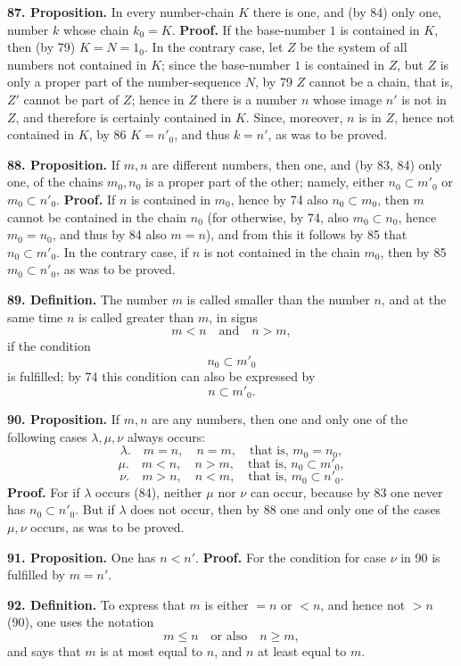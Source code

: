 \documentclass[11pt]{article}
\newcommand{\partof}{\mathrel{\subset}}
\begin{document}
\noindent\textbf{87. Proposition.} In every number-chain $K$ there is one, and (by 84) only one, number $k$ whose chain $k_0=K$. \textbf{Proof.} If the base-number $1$ is contained in $K$, then (by 79) $K=N=1_0$. In the contrary case, let $Z$ be the system of all numbers not contained in $K$; since the base-number $1$ is contained in $Z$, but $Z$ is only a proper part of the number-sequence $N$, by 79 $Z$ cannot be a chain, that is, $Z'$ cannot be part of $Z$; hence in $Z$ there is a number $n$ whose image $n'$ is not in $Z$, and therefore is certainly contained in $K$. Since, moreover, $n$ is in $Z$, hence not contained in $K$, by 86 $K=n'_0$, and thus $k=n'$, as was to be proved.

\noindent\textbf{88. Proposition.} If $m,n$ are different numbers, then one, and (by 83, 84) only one, of the chains $m_0,n_0$ is a proper part of the other; namely, either $n_0\partof m'_0$ or $m_0\partof n'_0$. \textbf{Proof.} If $n$ is contained in $m_0$, hence by 74 also $n_0\partof m_0$, then $m$ cannot be contained in the chain $n_0$ (for otherwise, by 74, also $m_0\partof n_0$, hence $m_0=n_0$, and thus by 84 also $m=n$), and from this it follows by 85 that $n_0\partof m'_0$. In the contrary case, if $n$ is not contained in the chain $m_0$, then by 85 $m_0\partof n'_0$, as was to be proved.

\noindent\textbf{89. Definition.} The number $m$ is called smaller than the number $n$, and at the same time $n$ is called greater than $m$, in signs
\[
m<n \quad\text{and}\quad n>m,
\]
if the condition
\[
n_0\partof m'_0
\]
is fulfilled; by 74 this condition can also be expressed by
\[
n\partof m'_0.
\]

\noindent\textbf{90. Proposition.} If $m,n$ are any numbers, then one and only one of the following cases $\lambda,\mu,\nu$ always occurs:
\[
\lambda.\quad m=n,\quad n=m,\quad \text{that is, } m_0=n_0,
\]
\[
\mu.\quad m<n,\quad n>m,\quad \text{that is, } n_0\partof m'_0,
\]
\[
\nu.\quad m>n,\quad n<m,\quad \text{that is, } m_0\partof n'_0.
\]
\textbf{Proof.} For if $\lambda$ occurs (84), neither $\mu$ nor $\nu$ can occur, because by 83 one never has $n_0\partof n'_0$. But if $\lambda$ does not occur, then by 88 one and only one of the cases $\mu,\nu$ occurs, as was to be proved.

\noindent\textbf{91. Proposition.} One has $n<n'$. \textbf{Proof.} For the condition for case $\nu$ in 90 is fulfilled by $m=n'$.

\noindent\textbf{92. Definition.} To express that $m$ is either $=n$ or $<n$, and hence not $>n$ (90), one uses the notation
\[
m\le n \quad\text{or also}\quad n\ge m,
\]
and says that $m$ is at most equal to $n$, and $n$ at least equal to $m$.
\end{document}
